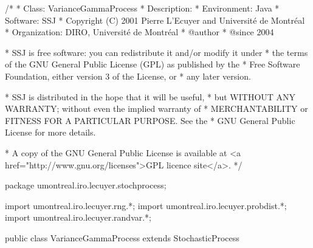 \begin{code}
\begin{hide}
/*
 * Class:        VarianceGammaProcess
 * Description:  
 * Environment:  Java
 * Software:     SSJ 
 * Copyright (C) 2001  Pierre L'Ecuyer and Université de Montréal
 * Organization: DIRO, Université de Montréal
 * @author       
 * @since        2004

 * SSJ is free software: you can redistribute it and/or modify it under
 * the terms of the GNU General Public License (GPL) as published by the
 * Free Software Foundation, either version 3 of the License, or
 * any later version.

 * SSJ is distributed in the hope that it will be useful,
 * but WITHOUT ANY WARRANTY; without even the implied warranty of
 * MERCHANTABILITY or FITNESS FOR A PARTICULAR PURPOSE.  See the
 * GNU General Public License for more details.

 * A copy of the GNU General Public License is available at
   <a href="http://www.gnu.org/licenses">GPL licence site</a>.
 */
\end{hide}
package umontreal.iro.lecuyer.stochprocess;\begin{hide}
import umontreal.iro.lecuyer.rng.*;
import umontreal.iro.lecuyer.probdist.*;
import umontreal.iro.lecuyer.randvar.*;

\end{hide}

public class VarianceGammaProcess extends StochasticProcess \begin{hide} {

    protected GammaProcess   randomTime;  // For the transformed time method
    protected BrownianMotion BM;

    protected double       theta,
                           sigma,
                           nu;
\end{hide}
\end{code}
